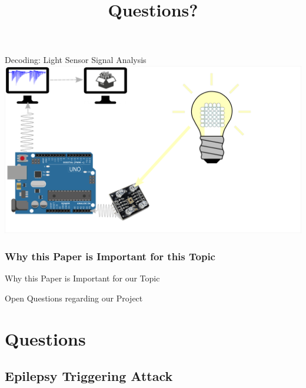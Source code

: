 \documentclass[11pt,t,usepdftitle=false,aspectratio=169]{beamer}
\begin{document}
\begin{frame}{Decoding: Light Sensor Signal Analysis}
{    }
     {
        \centering
        \includegraphics{img/Decoding_5.png}
    }
\end{frame}

\subsubsection{Why this Paper is Important for this Topic}%
\label{sub:why_this_paper_is_important_for_this_topic}
\begin{frame}{Why this Paper is Important for our Topic}
    
\end{frame}

\begin{frame}{Open Questions regarding our Project}
    
\end{frame}


\title{Questions?}
\subtitle{}
\section{Questions}


\appendix
\subsection{Epilepsy Triggering Attack}%
\label{sub:epilepsy_triggering_attack}
\end{document}

